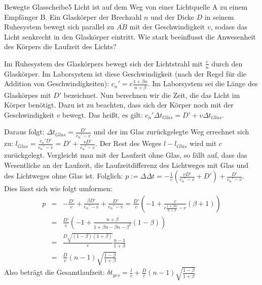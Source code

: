 \begin{problem}{Bewegte Glasscheibe}{5}
Licht ist auf dem Weg von einer Lichtquelle A zu einem Empfänger B. Ein Glaskörper der Brechzahl $n$ und der Dicke $D$ in seinem Ruhesystem bewegt sich parallel zu $\overline{AB}$ mit der Geschwindigkeit $v$, sodass das Licht senkrecht in den Glaskörper eintritt. Wie stark beeinflusst die Anwesenheit des Körpers die Laufzeit des Lichts?
\begin{solution}
Im Ruhesystem des Glaskörpers bewegt sich der Lichtstrahl mit $\frac cn$ durch den Glaskörper. Im Laborsystem ist diese Geschwindigkeit (nach der Regel für die Addition von Geschwindigkeiten): $c_n'=c\frac{1+\beta n}{n+\beta}$. Im Laborsystem sei die Länge des Glaskörpes mit $D'$ bezeichnet. Nun berechnen wir die Zeit, die das Licht im Körper benötigt. Dazu ist zu beachten, dass sich der Körper noch mit der Geschwindigkeit $v$ bewegt. Das heißt, es gilt: $c_n'\Delta t_{Glas}=D'+v\Delta t_{Glas}$.

Daraus folgt: $\Delta t_{Glas}=\frac{D'}{c_n'-v}$ und der im Glas zurückgelegte Weg errechnet sich zu: $l_{Glas}=\frac{c_n'D'}{c_n'-v}=D'+\frac{vD'}{c_n'-v}$. Der Rest des Weges $l-l_{Glas}$ wird mit $c$ zurückgelegt. Vergleicht man mit der Laufzeit ohne Glas, so fällt auf, dass das Wesentliche an der Laufzeit, die Laufzeitdifferenz des Lichtweges mit Glas und des Lichtweges ohne Glas ist. Folglich: $p:=\Delta \Delta t=-\frac 1c (\frac{vD'}{c_n'-v}+D')+\frac{D'}{c_n'-v}$. Dies lässt sich wie folgt umformen:
\begin{eqnarray}
\nonumber p&=&-\frac{D'}c+\frac{\beta D'}{c_n'-v}+\frac{D'}{c_n'-v}=\frac{D'}{c}\left(-1+\frac{c}{c\frac{1+\beta n}{n+\beta}-v}(\beta+1)\right)\\
\nonumber &=&\frac{D'}c\left(-1+\frac{n+\beta}{1+\beta n-\beta n-\beta^2}(1-\beta)\right)\\
\nonumber &=&\frac{D\sqrt{(1-\beta)(1+\beta)}}{c}\frac{n-1}{1+\beta}\\
\nonumber &=&\frac Dc(n-1)\sqrt{\frac{1-\beta}{1+\beta}}
\end{eqnarray}
Also beträgt die Gesamtlaufzeit: $\delta t_{ges}=\frac lc+\frac Dc(n-1)\sqrt{\frac{1-\beta}{1+\beta}}$
\end{solution}
\end{problem}


